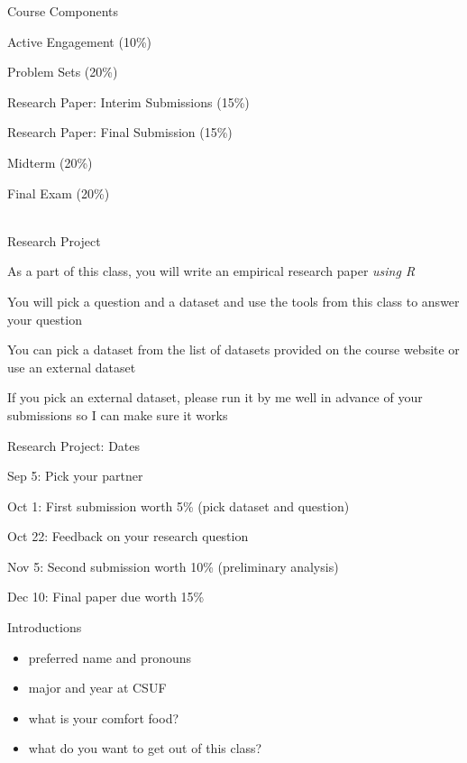 \documentclass{./../div_teaching_slides}
\begin{document}
\begin{frame}{Course Components}
\begin{witemize}
\item Active Engagement (10\%)
\item Problem Sets (20\%)
\item Research Paper: Interim Submissions (15\%)
\item Research Paper: Final Submission (15\%)
\item Midterm (20\%)
\item Final Exam (20\%) \\~\\
\end{witemize}
\end{frame}

\begin{frame}{Research Project}
\begin{witemize}
\item As a part of this class, you will write an empirical research paper \textit{using R} 
\item You will pick a question and a dataset and use the tools from this class to answer your question 
\item You can pick a dataset from the list of datasets provided on the course website or use an external dataset 
\item If you pick an external dataset, please run it by me well in advance of your submissions so I can make sure it works
\end{witemize}
\end{frame}

\begin{frame}{Research Project: Dates}
\begin{witemize}
\item Sep 5: Pick your partner
\item Oct 1: First submission worth 5\% (pick dataset and question)
\item Oct 22: Feedback on your research question
\item Nov 5: Second submission worth 10\% (preliminary analysis)
\item Dec 10: Final paper due worth 15\%
\end{witemize}
\end{frame}

\begin{frame}{Introductions}
\begin{itemize}
\item preferred name and pronouns
\item major and year at CSUF 
\item what is your comfort food?
\item what do you want to get out of this class?
\end{itemize}
\end{frame}
\end{document}
